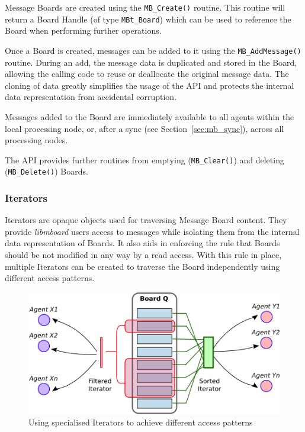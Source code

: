 Message Boards are created using the \texttt{MB\_Create()} routine. This routine will return a Board Handle (of type \texttt{MBt\_Board}) which can be used to reference the Board when performing further operations.

Once a Board is created, messages can be added to it using the \texttt{MB\_AddMessage()} routine. During an add, the message data is duplicated and stored in the Board, allowing the calling code to reuse or deallocate the original message data. The cloning of data greatly simplifies the usage of the API and protects the internal data representation from accidental corruption. 

Messages added to the Board are immediately available to all agents within the local processing node, or, after a sync (see Section~\ref{sec:mb_sync}), across all processing nodes.

The API provides further routines from emptying (\texttt{MB\_Clear()}) and deleting  (\texttt{MB\_Delete()}) Boards.

\subsubsection{Iterators}
\label{sec:mb_iterators}

Iterators are opaque objects used for traversing Message Board content. They provide \textit{libmboard} users access to messages while isolating them from the internal data representation of Boards. It also aids in enforcing the rule that Boards should be not modified in any way by a read access. With this rule in place, multiple Iterators can be created to traverse the Board independently using different access patterns.

\begin{figure}[ht]
 \centering
  \includegraphics[scale=0.8]{iterator.png}
 \caption{Using specialised Iterators to achieve different access patterns}
 \label{fig:mb_iterators}
\end{figure}

